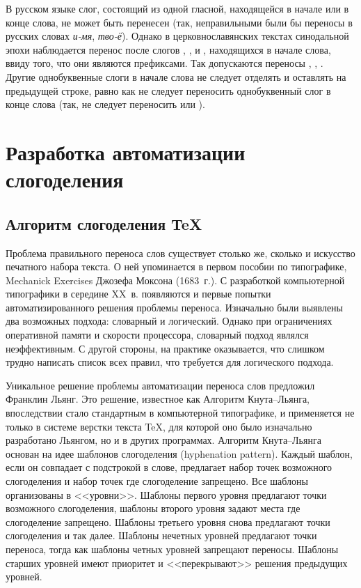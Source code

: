 \documentclass[12pt,a4paper,oneside]{extarticle}
\begin{document}
В русском языке слог, состоящий из одной гласной, находящейся в начале или в конце слова, не может быть перенесен (так, неправильными были бы переносы в русских словах \emph{и-мя}, \emph{тво-ё}). Однако в церковнославянских текстах синодальной эпохи наблюдается перенос после слогов , , и , находящихся в начале слова, ввиду того, что они являются префиксами. Так допускаются переносы , , .  Другие однобуквенные слоги в начале слова не следует отделять и оставлять на предыдущей строке, равно как не следует переносить однобуквенный слог в конце слова (так, не следует переносить  или ).

\section{Разработка автоматизации слогоделения}

\subsection{Алгоритм слогоделения \TeX{}}

Проблема правильного переноса слов существует столько же, сколько и искусство печатного набора текста. О ней упоминается в первом пособии по типографике, \textenglish{Mechanick Exercises} Джозефа Моксона (1683~г.). С разработкой компьютерной типографики в середине XX~в. появляются и первые попытки автоматизированного решения проблемы переноса. Изначально были выявлены два возможных подхода: словарный и логический. Однако при ограничениях оперативной памяти и скорости процессора, словарный подход являлся неэффективным. С другой стороны, на практике оказывается, что слишком трудно написать список всех правил, что требуется для логического подхода.

Уникальное решение проблемы автоматизации переноса слов предложил Франклин Льянг\autocite[][]{liang1983}. Это решение, известное как Алгоритм Кнута--Льянга, впоследствии стало стандартным в компьютерной типографике, и применяется не только в системе верстки текста \TeX{}, для которой оно было изначально разработано Льянгом, но и в других программах\autocite[Первое описание системы \TeX{} см. ][]{knuth1979}. Алгоритм Кнута--Льянга основан на идее шаблонов слогоделения (\textenglish{hyphenation pattern}).
Каждый шаблон, если он совпадает с подстрокой в слове, предлагает набор точек возможного слогоделения и набор точек где слогоделение запрещено. Все шаблоны организованы в <<уровни>>. Шаблоны первого уровня предлагают точки возможного слогоделения, шаблоны второго уровня
задают места где слогоделение запрещено. Шаблоны третьего уровня снова предлагают точки слогоделения и так далее. Шаблоны нечетных уровней
предлагают точки переноса, тогда как шаблоны четных уровней запрещают переносы. Шаблоны старших уровней имеют приоритет и <<перекрывают>>
решения предыдущих уровней.
\end{document}
